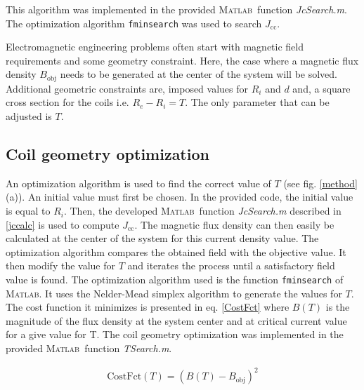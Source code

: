 \documentclass{ws-jmrr}
\newcommand{\MATLAB}{{\textsc{Matlab}}}
\begin{document}
\begin{multicols}{2}
This algorithm was implemented in the provided \MATLAB ~function \emph{JcSearch.m}. The optimization algorithm \texttt{fminsearch} was used to search $J_{\textrm{cc}}$.\par
Electromagnetic engineering problems often start with magnetic field requirements and some geometry constraint. Here, the case where a magnetic flux density $B_{\textrm{obj}}$ needs to be generated at the center of the system will be solved. Additional geometric constraints are, imposed values for $R_i$ and $d$ and, a square cross section for the coils i.e. $R_e-R_i=T$. The only parameter that can be adjusted is $T$.\par

\subsection{Coil geometry optimization}
An optimization algorithm is used to find the correct value of $T$ (see fig. \ref{method} (a)). An initial value must first be chosen. In the provided code, the initial value is equal to $R_i$. Then, the developed \MATLAB ~function \emph{JcSearch.m} described in \ref{jccalc} is used to compute $J_{\textrm{cc}}$. The magnetic flux density can then easily be calculated at the center of the system for this current density value. The optimization algorithm compares the obtained field with the objective value. It then modify the value for $T$ and iterates the process until a satisfactory field value is found. The optimization algorithm used is the function \texttt{fminsearch} of \MATLAB. It uses the Nelder-Mead simplex algorithm \cite{lagarias1998convergence} to generate the values for $T$. The cost function it minimizes is presented in eq. \ref{CostFct} where $B(T)$ is the magnitude of the flux density at the system center and at critical current value for a give value for T. The coil geometry optimization was implemented in the provided \MATLAB ~function \emph{TSearch.m}.

\begin{align}
\textrm{CostFct}(T)=\left ( B(T)-B_{\textrm{obj}} \right )^{2}
\label{CostFct}
\end{align}


\end{multicols}
\end{document}

